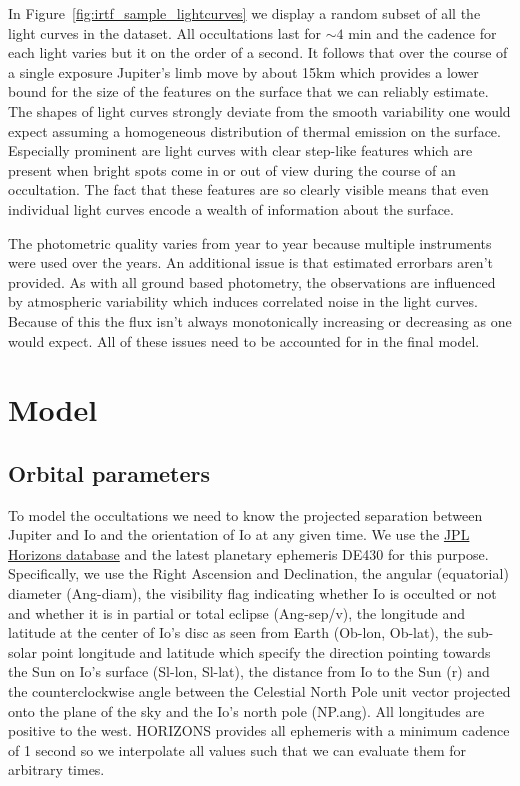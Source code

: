 \documentclass[modern]{aastex62}
\begin{document}
In Figure~\ref{fig:irtf_sample_lightcurves} we display a random subset of all the light curves
in the dataset.
All occultations last for $\sim4$ min and the cadence for each light varies but it on the order of a second.
It follows that over the course of a single exposure Jupiter's limb move by about 15km which provides a lower bound for the size of the features on the surface that we can reliably estimate.
The shapes of light curves strongly deviate from the smooth variability one would expect assuming a homogeneous distribution of thermal emission on the surface.
Especially prominent are light curves with clear step-like features which are present when bright spots come in or out of view during the course of an occultation.
The fact that these features are so clearly visible means that even individual light curves encode a wealth of information about the surface.

The photometric quality varies from year to year because multiple instruments were used over the years.
An additional issue is that estimated errorbars aren't provided.
As with all ground based photometry, the observations are influenced by atmospheric variability which induces correlated noise in the light curves.
Because of this the flux isn't always monotonically increasing or decreasing as one would expect.
All of these issues need to be accounted for in the final model.

\section{Model}
\label{sec:model}
\subsection{Orbital parameters}
\label{ssec:orbital_parameters}
To model the occultations we need to know the projected separation between Jupiter and Io and the orientation of Io at any given time.
We use the \href{https://ssd.jpl.nasa.gov/horizons.cgi}{JPL Horizons database} and the latest planetary ephemeris DE430 \citep{folkner_planetary_2014} for this purpose.
Specifically, we use the Right Ascension and Declination, the angular (equatorial) diameter (\textsf{Ang-diam}), the visibility flag indicating whether Io is occulted or not and whether it is in partial or total eclipse (\textsf{Ang-sep/v}), the longitude and latitude at the center of Io's disc as seen from Earth (\textsf{Ob-lon}, \textsf{Ob-lat}), the sub-solar point longitude and latitude which specify the direction pointing towards the Sun on Io's surface (\textsf{Sl-lon}, \textsf{Sl-lat}), the distance from Io to the Sun (\textsf{r}) and
the counterclockwise angle between the Celestial North Pole unit vector projected onto the plane of the sky and the Io's north pole (\textsf{NP.ang}).
All longitudes are positive to the west.
\textsf{HORIZONS} provides all ephemeris with a minimum cadence of 1 second so we interpolate all values such that we can evaluate them for arbitrary times.
\end{document}
